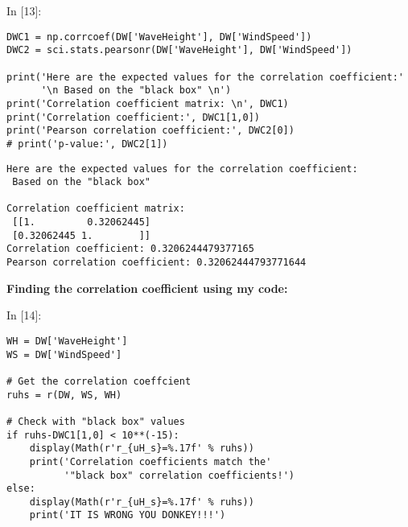 \documentclass[11pt]{article}
\newif\ifcode
\newif\ifleftmargins
\newlength{\promptlength}
\newcommand{\prompt}[3]{
        \needspace{1.1cm}
        \settowidth{\promptlength}{ #1 [#3] }
        \ifleftmargins\hspace{-\promptlength}\hspace{-5pt}\fi
        {\color{#2}#1 [#3]:}
        \ifleftmargins\vspace{-2.7ex}\fi
    }
\renewcommand{\paragraph}{\textbf}
\begin{document}
    
\prompt{In}{incolor}{13}
\codetrue
\begin{tcolorbox}[breakable, size=fbox, boxrule=1pt, pad at break*=1mm, colback=cellbackground, colframe=cellborder]
\begin{verbatim}
DWC1 = np.corrcoef(DW['WaveHeight'], DW['WindSpeed'])
DWC2 = sci.stats.pearsonr(DW['WaveHeight'], DW['WindSpeed'])

print('Here are the expected values for the correlation coefficient:' 
      '\n Based on the "black box" \n')
print('Correlation coefficient matrix: \n', DWC1)
print('Correlation coefficient:', DWC1[1,0])
print('Pearson correlation coefficient:', DWC2[0])
# print('p-value:', DWC2[1])
\end{verbatim}
\end{tcolorbox}
\codefalse

    \begin{Verbatim}[commandchars=\\\{\}]
Here are the expected values for the correlation coefficient:
 Based on the "black box"

Correlation coefficient matrix:
 [[1.         0.32062445]
 [0.32062445 1.        ]]
Correlation coefficient: 0.3206244479377165
Pearson correlation coefficient: 0.32062444793771644

    \end{Verbatim}

    \hypertarget{finding-the-correlation-coefficient-using-my-code}{%
\paragraph{Finding the correlation coefficient using my
code:}\label{finding-the-correlation-coefficient-using-my-code}}

    
\prompt{In}{incolor}{14}
\codetrue
\begin{tcolorbox}[breakable, size=fbox, boxrule=1pt, pad at break*=1mm, colback=cellbackground, colframe=cellborder]
\begin{verbatim}
WH = DW['WaveHeight']
WS = DW['WindSpeed']

# Get the correlation coeffcient
ruhs = r(DW, WS, WH)

# Check with "black box" values
if ruhs-DWC1[1,0] < 10**(-15):
    display(Math(r'r_{uH_s}=%.17f' % ruhs))
    print('Correlation coefficients match the'
          '"black box" correlation coefficients!')
else: 
    display(Math(r'r_{uH_s}=%.17f' % ruhs))
    print('IT IS WRONG YOU DONKEY!!!')
    
\end{verbatim}
\end{tcolorbox}
\codefalse
\end{document}
